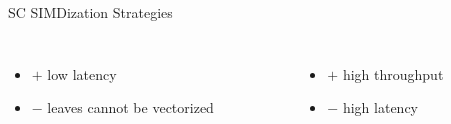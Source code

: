 \begin{frame}{SC SIMDization Strategies}
\begin{columns}[t]
\begin{column}[T]{5.0cm}
\begin{figure}[!h]
{
      }
      \end{figure}
    \end{column}
  \end{columns}
  \vfill
  \pause
  \begin{columns}[t]
    \begin{column}[T]{5.5cm}
      \begin{itemize}
        \item $+$ low latency
        \item $-$ leaves cannot be vectorized
      \end{itemize}
    \end{column}
    \begin{column}[T]{5.5cm}
      \begin{itemize}
        \item $+$ high throughput
        \item $-$ high latency
      \end{itemize}
    \end{column}
  \end{columns}
  \vfill
\end{frame}

